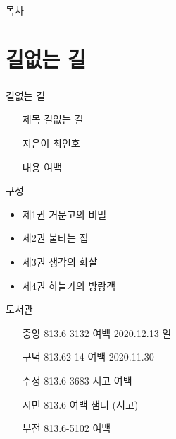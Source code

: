 \documentclass[aspectratio=1610,17pt,xcolor=pdftex,dvipsnames,table,handout]{beamer}
\begin{document}
		\begin{frame} [plain]{목차}
		\tableofcontents%
		\end{frame}


		\section{ 길없는 길}

		\begin{frame} [t,plain]
		\frametitle{}

			\begin{block} {길없는 길}
			\setlength{\leftmargini}{4em}			
			\begin{itemize}
				\item [제목]  	길없는 길
				\item [지은이]	최인호
				\item [내용]		여백
			\end{itemize}
			\end{block}						

			\begin{block} {구성}
			\setlength{\leftmargini}{1em}			
			\begin{itemize}
				\item 제1권 거문고의 비밀
				\item 제2권 불타는 집
				\item 제3권 생각의 화살
				\item 제4권 하늘가의 방랑객
			\end{itemize}
			\end{block}						


			\begin{block} {도서관}
			\setlength{\leftmargini}{4em}			
			\begin{itemize}
				\item [중앙] 	813.6 3132	여백 	2020.12.13 일
				\item [구덕]	813.62-14	여백 	2020.11.30
				\item [수정]	813.6-3683	서고	여백
				\item [시민]	813.6		여백 샘터 (서고)	
				\item [부전]	813.6-5102	여백
			\end{itemize}
			\end{block}						




		\end{frame}						
\end{document}
